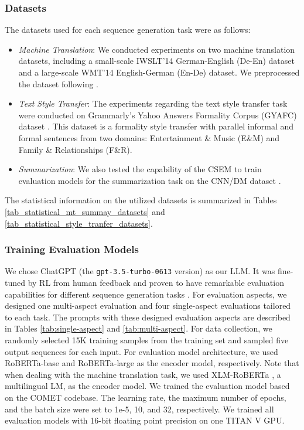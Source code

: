 \documentclass[lettersize,journal]{IEEEtran}
\begin{document}
\subsubsection{Datasets}
The datasets used for each sequence generation task were as follows:
\begin{itemize}
    \item \textit{Machine Translation}: 
    We conducted experiments on two machine translation datasets, including a small-scale IWSLT’14 German-English (De-En) dataset and a large-scale WMT’14 English-German (En-De) dataset. We preprocessed the dataset following \cite{hu2021ranknas}.
    \item \textit{Text Style Transfer}:
    The experiments regarding the text style transfer task were conducted on Grammarly’s Yahoo Answers Formality Corpus (GYAFC) dataset \cite{rao2018dear}.
    This dataset is a formality style transfer with parallel informal and formal sentences from two domains: Entertainment \& Music (E\&M) and Family \& Relationships (F\&R).
    \item \textit{Summarization}:
    We also tested the capability of the CSEM to train evaluation models for the summarization task on the CNN/DM dataset \cite{hermann2015teaching}.
\end{itemize}
The statistical information on the utilized datasets is summarized in Tables \ref{tab_statistical_mt_summay_datasets} and \ref{tab_statistical_style_tranfer_datasets}.

\subsubsection{Training Evaluation Models}
We chose ChatGPT (the \texttt{gpt-3.5-turbo-0613} version) as our LLM.
It was fine-tuned by RL from human feedback \cite{christiano2017deep} and proven to have remarkable evaluation capabilities for different sequence generation tasks \cite{wang2023chatgpt}.
For evaluation aspects, we designed one multi-aspect evaluation and four single-aspect evaluations tailored to each task.
The prompts with these designed evaluation aspects are described in Tables \ref{tab:single-aspect} and \ref{tab:multi-aspect}.
For data collection, we randomly selected 15K training samples from the training set and sampled five output sequences for each input. 
For evaluation model architecture, we used RoBERTa-base and RoBERTa-large \cite{liu2019roberta} as the encoder model, respectively.
Note that when dealing with the machine translation task, we used XLM-RoBERTa \cite{conneau2019unsupervised}, a multilingual LM, as the encoder model.
We trained the evaluation model based on the COMET codebase.
The learning rate, the maximum number of epochs, and the batch size were set to 1e-5, 10, and 32, respectively.
We trained all evaluation models with 16-bit floating point precision on one TITAN V GPU.
\end{document}
